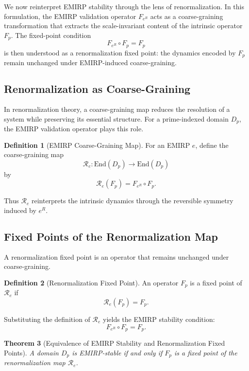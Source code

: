 \documentclass[11pt]{article}
\theoremstyle{definition}
\newtheorem{definition}{Definition}[section]
\theoremstyle{plain}
\newtheorem{theorem}[definition]{Theorem}
\theoremstyle{remark}
\begin{document}
We now reinterpret EMIRP stability through the lens of renormalization.
In this formulation, the EMIRP validation operator $F_{e^R}$ acts as a
coarse-graining transformation that extracts the scale-invariant content
of the intrinsic operator $F_p$. The fixed-point condition
\[
F_{e^R} \circ F_p = F_p
\]
is then understood as a renormalization fixed point: the dynamics
encoded by $F_p$ remain unchanged under EMIRP-induced coarse-graining.

\subsection{Renormalization as Coarse-Graining}

In renormalization theory, a coarse-graining map reduces the resolution
of a system while preserving its essential structure. For a
prime-indexed domain $D_p$, the EMIRP validation operator plays this
role.

\begin{definition}[EMIRP Coarse-Graining Map]
For an EMIRP $e$, define the coarse-graining map
\[
\mathcal{R}_e : \mathrm{End}(D_p) \to \mathrm{End}(D_p)
\]
by
\[
\mathcal{R}_e(F_p) = F_{e^R} \circ F_p.
\]
\end{definition}

Thus $\mathcal{R}_e$ reinterprets the intrinsic dynamics through the
reversible symmetry induced by $e^R$.

\subsection{Fixed Points of the Renormalization Map}

A renormalization fixed point is an operator that remains unchanged
under coarse-graining.

\begin{definition}[Renormalization Fixed Point]
An operator $F_p$ is a fixed point of $\mathcal{R}_e$ if
\[
\mathcal{R}_e(F_p) = F_p.
\]
\end{definition}

Substituting the definition of $\mathcal{R}_e$ yields the EMIRP
stability condition:
\[
F_{e^R} \circ F_p = F_p.
\]

\begin{theorem}[Equivalence of EMIRP Stability and Renormalization Fixed Points]
A domain $D_p$ is EMIRP-stable if and only if $F_p$ is a fixed point of
the renormalization map $\mathcal{R}_e$.
\end{theorem}
\end{document}
